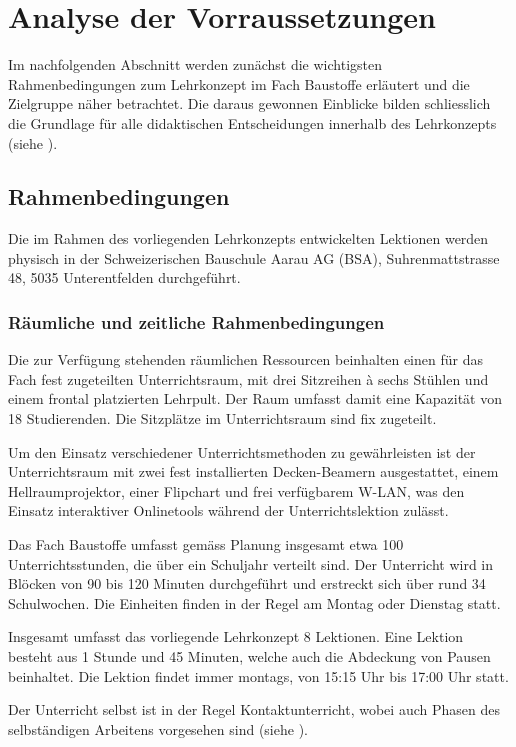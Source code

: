 \documentclass[
11pt,
captions=tableheading,
smallheadings,
headsepline,
footsepline, 
parskip=half-,
]{scrartcl}
\begin{document}
\clearpage
\section{Analyse der Vorraussetzungen}
Im nachfolgenden Abschnitt werden zunächst die wichtigsten Rahmenbedingungen zum Lehrkonzept im Fach Baustoffe erläutert und die Zielgruppe näher betrachtet. Die daraus gewonnen Einblicke bilden schliesslich die Grundlage für alle didaktischen Entscheidungen innerhalb des Lehrkonzepts (siehe ).

\subsection{Rahmenbedingungen}
Die im Rahmen des vorliegenden Lehrkonzepts entwickelten Lektionen werden physisch in der Schweizerischen Bauschule Aarau AG (BSA), Suhrenmattstrasse 48, 5035 Unterentfelden durchgeführt.

\subsubsection{Räumliche und zeitliche Rahmenbedingungen}
Die zur Verfügung stehenden räumlichen Ressourcen beinhalten einen für das Fach fest zugeteilten Unterrichtsraum, mit drei Sitzreihen à sechs Stühlen und einem frontal platzierten Lehrpult. Der Raum umfasst damit eine Kapazität von 18 Studierenden. Die Sitzplätze im Unterrichtsraum sind fix zugeteilt. 

Um den Einsatz verschiedener Unterrichtsmethoden zu gewährleisten ist der Unterrichtsraum mit zwei fest installierten Decken-Beamern ausgestattet, einem Hellraumprojektor, einer Flipchart und frei verfügbarem W-LAN, was den Einsatz interaktiver Onlinetools während der Unterrichtslektion zulässt. 

Das Fach Baustoffe umfasst gemäss Planung insgesamt etwa 100 Unterrichtsstunden, die über ein Schuljahr verteilt sind. Der Unterricht wird in Blöcken von 90 bis 120 Minuten durchgeführt und erstreckt sich über rund 34 Schulwochen. Die Einheiten finden in der Regel am Montag oder Dienstag statt.

Insgesamt umfasst das vorliegende Lehrkonzept 8 Lektionen. Eine Lektion besteht aus 1 Stunde und 45 Minuten, welche auch die Abdeckung von Pausen beinhaltet. Die Lektion findet immer montags, von 15:15 Uhr bis 17:00 Uhr statt.

Der Unterricht selbst ist in der Regel Kontaktunterricht, wobei auch Phasen des selbständigen Arbeitens vorgesehen sind (siehe ).
\end{document}
